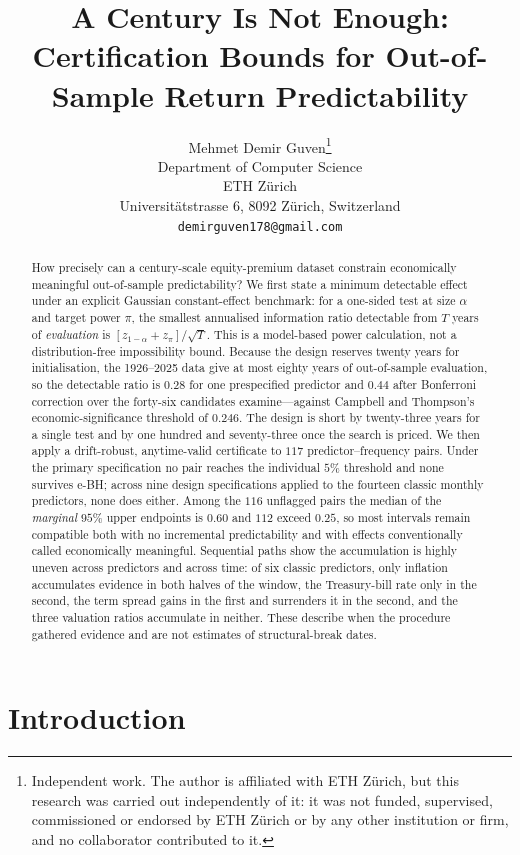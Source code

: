 \documentclass{article}
\title{A Century Is Not Enough:\\Certification Bounds for Out-of-Sample Return Predictability}
\author{%
  Mehmet Demir Guven\thanks{%
    Independent work. The author is affiliated with ETH Z\"urich, but this research was
    carried out independently of it: it was not funded, supervised, commissioned or endorsed
    by ETH Z\"urich or by any other institution or firm, and no collaborator contributed to
    it.} \\
  Department of Computer Science \\
  ETH Z\"urich \\
  Universit\"atstrasse 6, 8092 Z\"urich, Switzerland \\
  \texttt{demirguven178@gmail.com} \\
}
\theoremstyle{plain}
\theoremstyle{definition}
\begin{document}
\maketitle

\begin{abstract}
  How precisely can a century-scale equity-premium dataset constrain economically meaningful
  out-of-sample predictability? We first state a minimum detectable effect under an explicit
  Gaussian constant-effect benchmark: for a one-sided test at size $\alpha$ and target power
  $\pi$, the smallest annualised information ratio detectable from $T$ years of \emph{evaluation}
  is $[z_{1-\alpha}+z_\pi]/\sqrt{T}$. This is a model-based power calculation, not a
  distribution-free impossibility bound. Because the design reserves twenty years for
  initialisation, the 1926--2025 data give at most eighty years of out-of-sample evaluation, so
  the detectable ratio is $0.28$ for one prespecified predictor and $0.44$ after Bonferroni
  correction over the forty-six candidates \citet{goyal2024} examine---against Campbell and
  Thompson's economic-significance threshold of $0.246$. The design is short by twenty-three
  years for a single test and by one hundred and seventy-three once the search is priced.
  We then apply a drift-robust, anytime-valid certificate to $117$ predictor--frequency pairs.
  Under the primary specification no pair reaches the individual $5\%$ threshold and none
  survives e-BH; across nine design specifications applied to the fourteen classic monthly
  predictors, none does either. Among the $116$ unflagged pairs the median of the \emph{marginal}
  $95\%$ upper endpoints is $0.60$ and $112$ exceed $0.25$, so most intervals remain compatible
  both with no incremental predictability and with effects conventionally called economically
  meaningful. Sequential paths show the accumulation is highly uneven across predictors and
  across time: of six classic predictors, only inflation accumulates evidence in both halves of
  the window, the Treasury-bill rate only in the second, the term spread gains in the first and
  surrenders it in the second, and the three valuation ratios accumulate in neither. These
  describe when the procedure gathered evidence and are not estimates of structural-break
  dates.
\end{abstract}

\section{Introduction}
\end{document}
